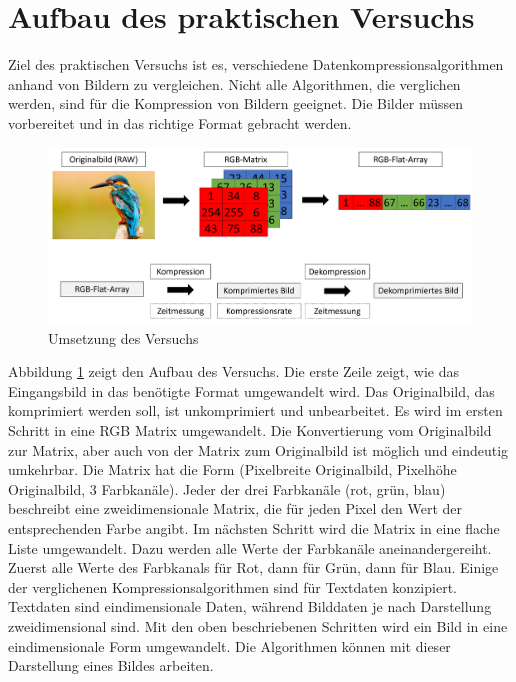 \documentclass[conference]{IEEEtran}
\begin{document}
\section{Aufbau des praktischen Versuchs}

Ziel des praktischen Versuchs ist es, verschiedene Datenkompressionsalgorithmen 
anhand von Bildern zu vergleichen. 
Nicht alle Algorithmen, die verglichen werden, sind für die Kompression von Bildern geeignet. 
Die Bilder müssen vorbereitet und in das richtige Format gebracht werden.

\begin{figure}[h]
  \centering
  \includegraphics[width=\columnwidth]{./images/Idea.png}
  \caption{Umsetzung des Versuchs}
  \label{fig:idea}
\end{figure}

Abbildung \ref{fig:idea} zeigt den Aufbau des Versuchs.
Die erste Zeile zeigt, wie das Eingangsbild in das benötigte Format umgewandelt
wird.
Das Originalbild, das komprimiert werden soll, ist unkomprimiert und unbearbeitet. 
Es wird im ersten Schritt in eine RGB Matrix umgewandelt.
Die Konvertierung vom Originalbild zur Matrix, aber auch von der Matrix zum Originalbild 
ist möglich und eindeutig umkehrbar.
Die Matrix hat die Form (Pixelbreite Originalbild, Pixelhöhe Originalbild,
3 Farbkanäle).
Jeder der drei Farbkanäle (rot, grün, blau) beschreibt eine zweidimensionale Matrix,
die für jeden Pixel den Wert der entsprechenden Farbe angibt.
Im nächsten Schritt wird die Matrix in eine flache Liste umgewandelt.
Dazu werden alle Werte der Farbkanäle aneinandergereiht.
Zuerst alle Werte des Farbkanals für Rot, dann für Grün, dann für Blau.
Einige der verglichenen Kompressionsalgorithmen sind für Textdaten konzipiert.
Textdaten sind eindimensionale Daten, während Bilddaten je nach Darstellung
zweidimensional sind.
Mit den oben beschriebenen Schritten wird ein Bild in eine eindimensionale
Form umgewandelt.
Die Algorithmen können mit dieser Darstellung eines Bildes arbeiten.
\end{document}
